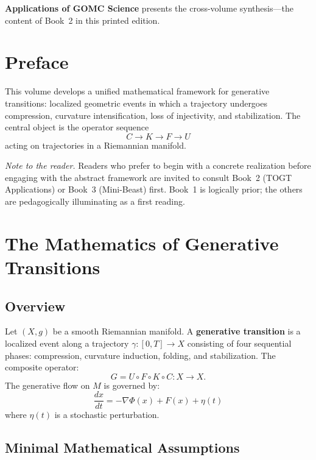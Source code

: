 \documentclass[11pt, twoside, openright]{book}
\theoremstyle{plain}
\theoremstyle{definition}
\begin{document}
\textbf{Applications of GOMC Science} presents the cross-volume
synthesis---the content of Book~2 in this printed edition.

\cleardoublepage

\chapter*{Preface}

This volume develops a unified mathematical framework for generative
transitions: localized geometric events in which a trajectory undergoes
compression, curvature intensification, loss of injectivity, and
stabilization. The central object is the operator sequence
\[
C \to K \to F \to U
\]
acting on trajectories in a Riemannian manifold.

\textit{Note to the reader.} Readers who prefer to begin with
a concrete realization before engaging with the abstract framework are
invited to consult Book~2 (TOGT Applications) or Book~3 (Mini-Beast)
first. Book~1 is logically prior; the others are pedagogically
illuminating as a first reading.

\cleardoublepage

\chapter{The Mathematics of Generative Transitions}

\section{Overview}

Let $(X, g)$ be a smooth Riemannian manifold. A \textbf{generative
transition} is a localized event along a trajectory $\gamma : [0,T] \to X$
consisting of four sequential phases: compression, curvature induction,
folding, and stabilization. The composite operator:
\[
G = U \circ F \circ K \circ C : X \to X.
\]
The generative flow on $M$ is governed by:
\[
\frac{dx}{dt} = -\nabla\Phi(x) + F(x) + \eta(t)
\]
where $\eta(t)$ is a stochastic perturbation.

\section{Minimal Mathematical Assumptions}
\end{document}

